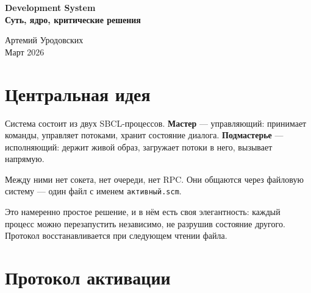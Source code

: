 \documentclass[11pt,a4paper]{article}
\begin{document}
\begin{titlepage}
\centering\vspace*{3cm}
{\LARGE\bfseries Development System\\[0.5em]
\large Суть, ядро, критические решения}

\vspace{1.5cm}
{\large Артемий Уродовских}\\[0.2em]
{\normalsize Март 2026}

\vspace{2.5cm}
\begin{abstract}
\noindent
Эта статья не про Telegram и не про HTTP. Она про то, как система организована внутри: как два независимых процесса договариваются о том, что выполнять; почему поток — это один файл с одной функцией; что значит «персистентный образ» и почему это не просто оптимизация; и как система замыкает петлю, порождая собственные модули через LLM.

Центральные темы: протокол активации, явное состояние в SICP-стиле, образ как реестр, метациркулярность.
\end{abstract}
\end{titlepage}

\tableofcontents
\newpage

\section{Центральная идея}

Система состоит из двух SBCL-процессов. \textbf{Мастер} — управляющий: принимает команды, управляет потоками, хранит состояние диалога. \textbf{Подмастерье} — исполняющий: держит живой образ, загружает потоки в него, вызывает напрямую.

Между ними нет сокета, нет очереди, нет RPC. Они общаются через файловую систему — один файл с именем \texttt{активный.scm}.

Это намеренно простое решение, и в нём есть своя элегантность: каждый процесс можно перезапустить независимо, не разрушив состояние другого. Протокол восстанавливается при следующем чтении файла.

\section{Протокол активации}
\label{sec:activation}
\end{document}
